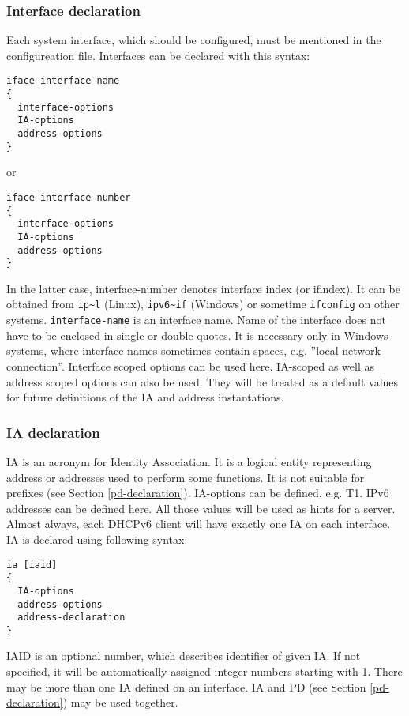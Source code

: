 \subsubsection{Interface declaration}

Each system interface, which should be configured, must be mentioned in
the configureation file. Interfaces can be declared with this syntax:
\begin{verbatim}
iface interface-name
{
  interface-options
  IA-options
  address-options
}
\end{verbatim}

or

\begin{verbatim}
iface interface-number
{
  interface-options
  IA-options
  address-options
}
\end{verbatim}

In the latter case, interface-number denotes interface index (or ifindex). It can be obtained
from \verb+ip~l+ (Linux), \verb+ipv6~if+ (Windows) or sometime
\verb+ifconfig+ on other systems. \verb+interface-name+ is an interface
name.  Name of the interface does not have to be enclosed in single or
double quotes. It is necessary only in Windows systems, where interface
names sometimes contain spaces, e.g. ''local network connection''.
Interface scoped options can be used here. IA-scoped as well as address
scoped options can also be used. They will be treated as a default
values for future definitions of the IA and address instantations.

\subsubsection{IA declaration}
\label{ia-declaration}
IA is an acronym for Identity Association. It is a logical entity
representing address or addresses used to perform some
functions. It is not suitable for prefixes (see Section \ref{pd-declaration}).
IA-options can be defined, e.g. T1. IPv6 addresses can be
defined here. All those values will be used as hints for a server.
Almost always, each DHCPv6 client will have exactly one IA on each
interface. IA is declared using following syntax:

\begin{verbatim}
ia [iaid]
{
  IA-options
  address-options
  address-declaration
}
\end{verbatim}

IAID is an optional number, which describes identifier of given IA. If
not specified, it will be automatically assigned integer numbers
starting with 1. There may be more than one IA defined on an
interface. IA and PD (see Section \ref{pd-declaration}) may be used
together.

